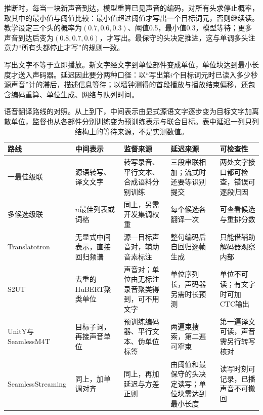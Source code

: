 推断时，每当一块新声音到达，模型重算已见声音的编码，对所有头求停止概率，取其中的最小值与阈值比较：最小值超过阈值才写出一个目标词元，否则继续读。教学设定三个头的概率为$(0.7,0.6,0.3)$、阈值0.5，最小值0.3，模型等待；更多声音到达后变为$(0.8,0.7,0.6)$，才写出。最保守的头决定推进，这与单调多头注意力“所有头都停止才写”的规则一致。

写出文字不等于立即播放。新文字经文字到单位部件变成单位，单位块达到最小长度才送入声码器。延迟因此要分两种口径：以“写出第$i$个目标词元时已读入多少秒源声音”计的滞后，描述信息等待；以墙钟测得的首段播放与播放结束偏移，还包含编码重算、单位生成、网络与队列时间。

\begin{table}[htbp]
  \centering
  \begin{tabularx}{\linewidth}{@{}>{\raggedright\arraybackslash}p{29mm}>{\raggedright\arraybackslash}p{26mm}>{\raggedright\arraybackslash}X>{\raggedright\arraybackslash}X>{\raggedright\arraybackslash}X@{}}
    \toprule
    路线 & 中间表示 & 监督来源 & 延迟来源 & 可检查性\\
    \midrule
    一最佳级联 & 源语转写、译文文字 & 转写录音、平行文本、合成语料分别训练 & 三段串联相加；流式时还要等识别提交 & 两处文字接口都可检查，错误可逐段归因\\
    多候选级联 & $n$最佳列表或词格 & 同上，另需开发集调权重 & 每个候选各翻译一次 & 可查看候选与重排分数\\
    Translatotron & 无显式中间表示，直接回归频谱 & 源—目标声音对，辅助音素标注 & 整句编码后自回归逐帧生成 & 只能借辅助解码器观察内部\\
    S2UT & 去重的HuBERT聚类单位 & 声音对；单位由无标注录音聚类得到，可不用文字 & 单位序列长，声码器另需时长预测 & 单位不可读；有文字时可加CTC输出\\
    UnitY与SeamlessM4T & 目标子词，再接声音单位 & 预训练编码器、平行文本、伪单位标签 & 两遍束搜索，第二遍可窄束 & 第一遍译文可读，声音需另行转写核对\\
    SeamlessStreaming & 同上，加单调对齐 & 同上，再加延迟与方差正则 & 由阈值和最保守的头决定读写；单位块需达到最小长度 & 读写时刻可记录，已播声音不可撤回\\
    \bottomrule
  \end{tabularx}
  \caption{语音翻译路线的对照。从上到下，中间表示由显式源语文字逐步变为目标文字加离散单位，监督也从各部件分别训练变为预训练表示与联合目标。表中延迟一列只列结构上的等待来源，不是实测数值。}
  \label{tab:nlp-speech-translation-routes}
\end{table}
